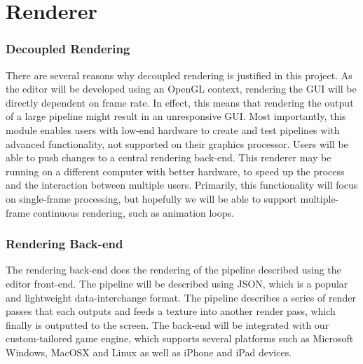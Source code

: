 
\chapter{Renderer}

\subsection{Decoupled Rendering}
There are several reasons why decoupled rendering is justified in this project. As the editor will be developed using an OpenGL context, rendering the GUI will be directly dependent on frame rate. In effect, this means that rendering the output of a large pipeline might result in an unresponsive GUI.
Most importantly, this module enables users with low-end hardware to create and test pipelines with advanced functionality, not supported on their graphics processor. Users will be able to push changes to a central rendering back-end. This renderer may be running on a different computer with better hardware, to speed up the process and the interaction between multiple users. 
Primarily, this functionality will focus on single-frame processing, but hopefully we will be able to support multiple-frame continuous rendering, such as animation loops. 
\subsection{Rendering Back-end}

The rendering back-end does the rendering of the pipeline described using the editor front-end. The pipeline will be described using JSON, which is a popular and lightweight data-interchange format. 
The pipeline describes a series of render passes that each outputs and feeds a texture into another render pass, which finally is outputted to the screen.
The back-end will be integrated with our custom-tailored game engine, which supports several platforms such as Microsoft Windows, MacOSX and Linux as well as iPhone and iPad devices.  